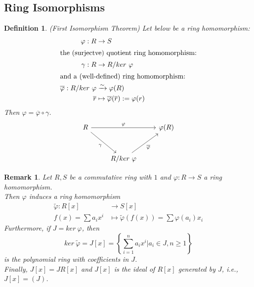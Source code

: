 \documentclass[a4paper,8pt]{article}
\newcommand{\isomorp}{\xrightarrow{\sim}}
\newcommand{\hlt}[1]{\textit{{\color{blue}#1}}}
\theoremstyle{theorem}
\newtheorem{definition}[theorem]{Definition}
\newtheorem{remark}[theorem]{Remark}
\begin{document}
\subsection{Ring Isomorphisms}

\begin{definition}
\hlt{(First Isomorphism Theorem)} Let below be a ring homomorphism:
\begin{align}
\varphi: R &\rightarrow S \nonumber \\
\intertext{the (surjectve) quotient ring homomorphism:}
\gamma: R &\rightarrow R/ker \ \varphi \nonumber \\
\intertext{and a (well-defined) ring homomorphism:}
\overline{\varphi}: R/ker \ \varphi &\isomorp \varphi(R) \nonumber \\
\overline{r} &\mapsto \overline{\varphi}(\overline{r}) := \varphi(r) \nonumber
\end{align}
Then $\varphi = \overline{\varphi} \circ \gamma$.
\begin{equation}\label{diagram}
\begin{tikzcd}
R \arrow{rr}{\varphi} \arrow[swap]{dr}{\gamma} & & \varphi(R) \\[10pt]
    & R/ker \ \varphi \arrow[swap]{ur}{\overline{\varphi}}
\end{tikzcd} \nonumber
\end{equation}	
\end{definition}


\begin{remark}
Let $R, S$ be a commutative ring with $1$ and $\varphi: R \rightarrow S$ a ring homomorphism.\\
Then $\varphi$ induces a ring homomorphism 
\begin{align}
\tilde{\varphi}: R[x] &\rightarrow S[x] \nonumber \\
f(x)=\sum a_i x^i &\mapsto \widetilde{\varphi}(f(x)) = \sum \varphi(a_i) x_i \nonumber
\end{align}
Furthermore, if $J=ker \ \varphi$, then 
\begin{equation}
ker \ \widetilde{\varphi} = J[x] = \left\{\sum_{i=1}^{n} a_i x^i | a_i \in J, n \geq 1 \right\} \nonumber
\end{equation}
is the polynomial ring with coefficients in $J$. \\
Finally, $J[x] = J R[x]$ and $J[x]$ is the ideal of $R[x]$ generated by $J$, i.e., $J[x] = (J)$.\\
\end{remark}
\end{document}
